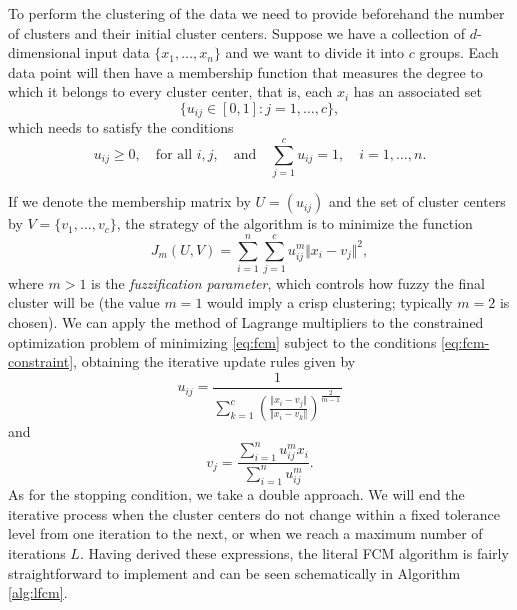 To perform the clustering of the data we need to provide beforehand the number of clusters and their initial cluster centers. Suppose we have a collection of $d$-dimensional input data $\{x_1,\dots,x_n\}$ and we want to divide it into $c$ groups. Each data point will then have a membership function that measures the degree to which it belongs to every cluster center, that is, each $x_i$ has an associated set
\[
\{u_{ij} \in [0,1]: j=1,\dots,c \},
\]
which needs to satisfy the conditions
\begin{equation} \label{eq:fcm-constraint}
u_{ij}\geq 0, \quad \text{for all } i,j, \quad \text{and} \quad \sum_{j=1}^c u_{ij} = 1, \quad i=1,\dots,n.
\end{equation}

If we denote the membership matrix by $U=(u_{ij})$ and the set of cluster centers by $V=\{v_1,\dots, v_c\}$, the strategy of the algorithm is to minimize the function
\begin{equation} \label{eq:fcm}
J_m(U,V) = \sum_{i=1}^n \sum_{j=1}^c u_{ij}^m \Vert x_i - v_j \Vert ^2,
\end{equation}
where $m > 1$ is the \textit{fuzzification parameter}, which controls how fuzzy the final cluster will be (the value $m=1$ would imply a crisp clustering; typically $m=2$ is chosen). We can apply the method of Lagrange multipliers to the constrained optimization problem of minimizing \eqref{eq:fcm} subject to the conditions \eqref{eq:fcm-constraint}, obtaining the iterative update rules given by
\begin{equation} \label{eq:fcm-update-membership}
  u_{ij}= \dfrac{1}{\displaystyle \sum_{k=1}^c \left( \frac{\Vert x_i - v_j \Vert}{\Vert x_i - v_k \Vert} \right)^{\frac{2}{m-1}}}
\end{equation}
and
\begin{equation} \label{eq:fcm-update-centers}
v_j = \dfrac{\displaystyle\sum_{i=1}^n u_{ij}^m x_i}{\displaystyle\sum_{i=1}^n u_{ij}^m}.
\end{equation}
As for the stopping condition, we take a double approach. We will end the iterative process when the cluster centers do not change within a fixed tolerance level from one iteration to the next, or when we reach a maximum number of iterations $L$. Having derived these expressions, the literal FCM algorithm is fairly straightforward to implement and can be seen schematically in Algorithm \ref{alg:lfcm}.

